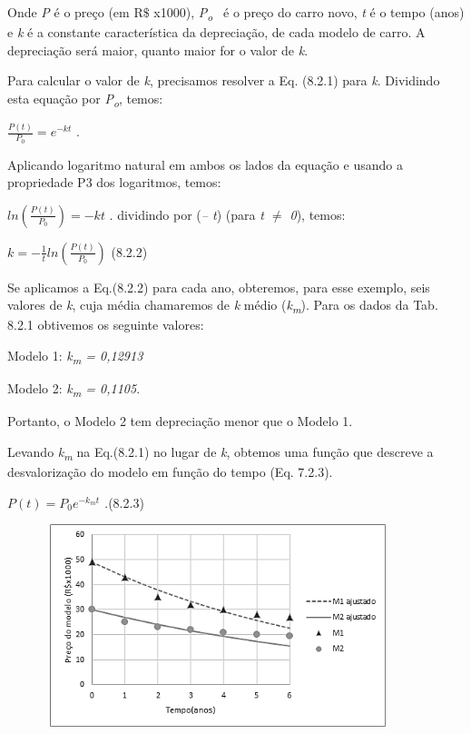 Onde \textit{P} é o preço (em R$\$$ x1000), \textit{P\textsubscript{o}~ }é o preço do carro novo, \textit{t} é o tempo (anos) e \textit{k} é a constante característica da depreciação, de cada modelo de carro. A depreciação será maior, quanto maior for o valor de \textit{k}. 

Para calcular o valor de \textit{k}, precisamos resolver a Eq. (8.2.1) para \textit{k}. Dividindo esta equação por \textit{P\textsubscript{o}}, temos:

\( \frac{P \left( t \right) }{P_{0}}=e^{-kt} \) .~ 

Aplicando logaritmo natural em ambos os lados da equação e usando a propriedade P3 dos logaritmos, temos:

\( ln \left( \frac{P \left( t \right) }{P_{0}} \right) =-kt  \) . dividindo por (\textit{– t}) (para \textit{t $ \neq $  0}), temos:

\( k=-\frac{1}{t}ln \left( \frac{P \left( t \right) }{P_{0}} \right)  \) \quad \quad \quad \quad \quad \quad \quad (8.2.2)

Se aplicamos a Eq.(8.2.2) para cada ano, obteremos, para esse exemplo, seis valores de \textit{k}, cuja média chamaremos de \textit{k} médio (\textit{k\textsubscript{m}}). Para os dados da Tab. 8.2.1 obtivemos os seguinte valores:

\quad Modelo 1: \textit{k\textsubscript{m} = 0,12913}

\quad Modelo 2: \textit{k\textsubscript{m} = 0,1105}.

Portanto, o Modelo 2 tem depreciação menor que o Modelo 1.

Levando \textit{k\textsubscript{m}} na Eq.(8.2.1) no lugar de \textit{k}, obtemos uma função que descreve a desvalorização do modelo em função do tempo (Eq. 7.2.3).

\( P \left( t \right) =P_{0}e^{-k_{m}t} \) \textit{.\quad \quad \quad \quad \quad \quad \quad }(8.2.3)

\begin{figure}[H]
	\begin{Center}
		\includegraphics[width=4.0in,height=2.32in]{capitulos/logaritmos_e_funcao_logaritmica/media/image10.png}
	\end{Center}
\end{figure}

